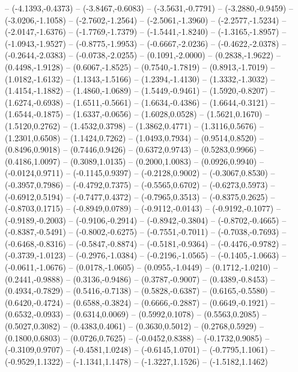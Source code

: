 {	-- (-4.1393,-0.4373)
	-- (-3.8467,-0.6083)
	-- (-3.5631,-0.7791)
	-- (-3.2880,-0.9459)
	-- (-3.0206,-1.1058)
	-- (-2.7602,-1.2564)
	-- (-2.5061,-1.3960)
	-- (-2.2577,-1.5234)
	-- (-2.0147,-1.6376)
	-- (-1.7769,-1.7379)
	-- (-1.5441,-1.8240)
	-- (-1.3165,-1.8957)
	-- (-1.0943,-1.9527)
	-- (-0.8775,-1.9953)
	-- (-0.6667,-2.0236)
	-- (-0.4622,-2.0378)
	-- (-0.2644,-2.0383)
	-- (-0.0738,-2.0255)
	-- (0.1091,-2.0000)
	-- (0.2838,-1.9622)
	-- (0.4498,-1.9128)
	-- (0.6067,-1.8525)
	-- (0.7540,-1.7819)
	-- (0.8913,-1.7019)
	-- (1.0182,-1.6132)
	-- (1.1343,-1.5166)
	-- (1.2394,-1.4130)
	-- (1.3332,-1.3032)
	-- (1.4154,-1.1882)
	-- (1.4860,-1.0689)
	-- (1.5449,-0.9461)
	-- (1.5920,-0.8207)
	-- (1.6274,-0.6938)
	-- (1.6511,-0.5661)
	-- (1.6634,-0.4386)
	-- (1.6644,-0.3121)
	-- (1.6544,-0.1875)
	-- (1.6337,-0.0656)
	-- (1.6028,0.0528)
	-- (1.5621,0.1670)
	-- (1.5120,0.2762)
	-- (1.4532,0.3798)
	-- (1.3862,0.4771)
	-- (1.3116,0.5676)
	-- (1.2301,0.6508)
	-- (1.1424,0.7262)
	-- (1.0493,0.7934)
	-- (0.9514,0.8520)
	-- (0.8496,0.9018)
	-- (0.7446,0.9426)
	-- (0.6372,0.9743)
	-- (0.5283,0.9966)
	-- (0.4186,1.0097)
	-- (0.3089,1.0135)
	-- (0.2000,1.0083)
	-- (0.0926,0.9940)
	-- (-0.0124,0.9711)
	-- (-0.1145,0.9397)
	-- (-0.2128,0.9002)
	-- (-0.3067,0.8530)
	-- (-0.3957,0.7986)
	-- (-0.4792,0.7375)
	-- (-0.5565,0.6702)
	-- (-0.6273,0.5973)
	-- (-0.6912,0.5194)
	-- (-0.7477,0.4372)
	-- (-0.7965,0.3513)
	-- (-0.8375,0.2625)
	-- (-0.8703,0.1715)
	-- (-0.8949,0.0789)
	-- (-0.9112,-0.0143)
	-- (-0.9192,-0.1077)
	-- (-0.9189,-0.2003)
	-- (-0.9106,-0.2914)
	-- (-0.8942,-0.3804)
	-- (-0.8702,-0.4665)
	-- (-0.8387,-0.5491)
	-- (-0.8002,-0.6275)
	-- (-0.7551,-0.7011)
	-- (-0.7038,-0.7693)
	-- (-0.6468,-0.8316)
	-- (-0.5847,-0.8874)
	-- (-0.5181,-0.9364)
	-- (-0.4476,-0.9782)
	-- (-0.3739,-1.0123)
	-- (-0.2976,-1.0384)
	-- (-0.2196,-1.0565)
	-- (-0.1405,-1.0663)
	-- (-0.0611,-1.0676)
	-- (0.0178,-1.0605)
	-- (0.0955,-1.0449)
	-- (0.1712,-1.0210)
	-- (0.2441,-0.9888)
	-- (0.3136,-0.9486)
	-- (0.3787,-0.9007)
	-- (0.4389,-0.8453)
	-- (0.4934,-0.7829)
	-- (0.5416,-0.7138)
	-- (0.5828,-0.6387)
	-- (0.6165,-0.5580)
	-- (0.6420,-0.4724)
	-- (0.6588,-0.3824)
	-- (0.6666,-0.2887)
	-- (0.6649,-0.1921)
	-- (0.6532,-0.0933)
	-- (0.6314,0.0069)
	-- (0.5992,0.1078)
	-- (0.5563,0.2085)
	-- (0.5027,0.3082)
	-- (0.4383,0.4061)
	-- (0.3630,0.5012)
	-- (0.2768,0.5929)
	-- (0.1800,0.6803)
	-- (0.0726,0.7625)
	-- (-0.0452,0.8388)
	-- (-0.1732,0.9085)
	-- (-0.3109,0.9707)
	-- (-0.4581,1.0248)
	-- (-0.6145,1.0701)
	-- (-0.7795,1.1061)
	-- (-0.9529,1.1322)
	-- (-1.1341,1.1478)
	-- (-1.3227,1.1526)
	-- (-1.5182,1.1462)
}
